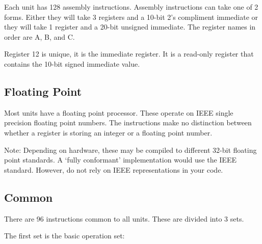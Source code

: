 \documentclass{article}
\begin{document}
Each unit has 128 assembly instructions. Assembly instructions can take one of 2
forms. Either they will take 3 registers and a 10-bit 2's compliment immediate
or they will take 1 register and a 20-bit unsigned immediate. The register
names in order are A, B, and C.

Register 12 is unique, it is the immediate register. It is a read-only register
that contains the 10-bit signed immediate value.

\subsection*{Floating Point}

Most units have a floating point processor. These operate on IEEE single
precision floating point numbers. The instructions make no distinction between
whether a register is storing an integer or a floating point number.

Note: Depending on hardware, these may be compiled to different 32-bit floating
point standards. A `fully conformant' implementation would use the IEEE
standard. However, do not rely on IEEE representations in your code.

\subsection*{Common}

There are 96 instructions common to all units. These are divided into 3 sets.

The first set is the basic operation set:
\end{document}
